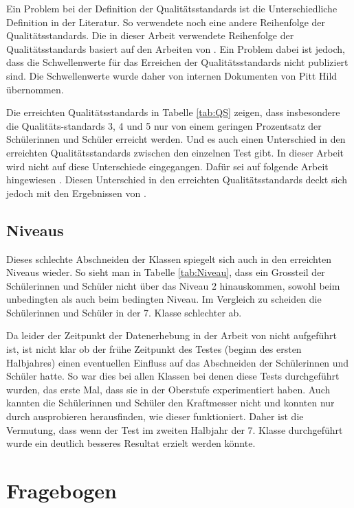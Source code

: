 Ein Problem bei der Definition der Qualitätsstandards ist die Unterschiedliche Definition in der Literatur. So verwendete \citet{Gut2013a} noch eine andere Reihenfolge der Qualitätsstandards. Die in dieser Arbeit verwendete Reihenfolge der Qualitätsstandards basiert auf den Arbeiten von \citet{Metzger2013, Hild2014a}. Ein Problem dabei ist jedoch, dass die Schwellenwerte für das Erreichen der Qualitätsstandards nicht publiziert sind. Die Schwellenwerte wurde daher von internen Dokumenten von Pitt Hild übernommen.

Die erreichten Qualitätsstandards in Tabelle \ref{tab:QS} zeigen, dass insbesondere die Qualitäts-standards 3, 4 und 5 nur von einem geringen Prozentsatz der Schülerinnen und Schüler erreicht werden. Und es auch einen Unterschied in den erreichten Qualitätsstandards zwischen den einzelnen Test gibt. In dieser Arbeit wird nicht auf diese Unterschiede eingegangen. Dafür sei auf folgende Arbeit hingewiesen \citet{Sichau2015}. Diesen Unterschied in den erreichten Qualitätsstandards deckt sich jedoch mit den Ergebnissen von \citet{Metzger2013}.

\subsection{Niveaus}

Dieses schlechte Abschneiden der Klassen spiegelt sich auch in den erreichten Niveaus wieder. So sieht man in Tabelle \ref{tab:Niveau}, dass ein Grossteil der Schülerinnen und Schüler nicht über das Niveau 2 hinauskommen, sowohl beim unbedingten als auch beim bedingten Niveau. Im Vergleich zu \citet{Metzger2013} scheiden die Schülerinnen und Schüler in der 7. Klasse schlechter ab. 

Da leider der Zeitpunkt der Datenerhebung in der Arbeit von \citet{Metzger2013} nicht aufgeführt ist, ist nicht klar ob der frühe Zeitpunkt des Testes (beginn des ersten Halbjahres) einen eventuellen Einfluss auf das Abschneiden der Schülerinnen und Schüler hatte. So war dies bei allen Klassen bei denen diese Tests durchgeführt wurden, das erste Mal, dass sie in der Oberstufe experimentiert haben. Auch kannten die Schülerinnen und Schüler den Kraftmesser nicht und konnten nur durch ausprobieren herausfinden, wie dieser funktioniert. Daher ist die Vermutung, dass wenn der Test im zweiten Halbjahr der 7. Klasse durchgeführt wurde ein deutlich besseres Resultat erzielt werden könnte.



\section{Fragebogen}

